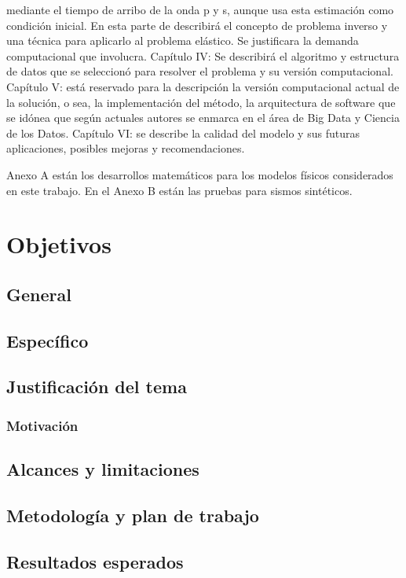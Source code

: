mediante el tiempo de arribo de la onda p y s, aunque usa esta estimación como
condición inicial. En esta parte de describirá el concepto de problema inverso y
una técnica para aplicarlo al problema elástico. Se justificara la demanda
computacional que involucra.
Capítulo IV: Se describirá el algoritmo y estructura de datos que se seleccionó
para resolver el problema y su versión computacional.
Capítulo V: está reservado para la descripción la versión computacional actual
de la solución, o sea, la implementación del método, la arquitectura de software
que se idónea que  según actuales autores se enmarca en el área de Big Data y
Ciencia de los Datos.
Capítulo VI: se describe la calidad del modelo y sus futuras aplicaciones,
posibles mejoras y recomendaciones.

Anexo A están los desarrollos matemáticos para los modelos físicos considerados
en este trabajo. En el Anexo B están las pruebas para sismos sintéticos.

\section{Objetivos}

\subsection{General}

\subsection{Específico}

\subsection{Justificación del tema}
\subsubsection{Motivación}

\subsection{Alcances y limitaciones}

\subsection{Metodología y plan de trabajo}

\subsection{Resultados esperados}

